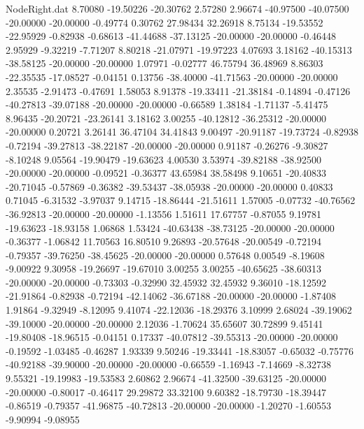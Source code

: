 \begin{filecontents}{NodeRight.dat}
   8.70080  -19.50226  -20.30762     2.57280    2.96674  -40.97500  -40.07500  -20.00000  -20.00000   -0.49774    0.30762   27.98434   32.26918
   8.75134  -19.53552  -22.95929    -0.82938   -0.68613  -41.44688  -37.13125  -20.00000  -20.00000   -0.46448    2.95929   -9.32219   -7.71207
   8.80218  -21.07971  -19.97223     4.07693    3.18162  -40.15313  -38.58125  -20.00000  -20.00000    1.07971   -0.02777   46.75794   36.48969
   8.86303  -22.35535  -17.08527    -0.04151    0.13756  -38.40000  -41.71563  -20.00000  -20.00000    2.35535   -2.91473   -0.47691    1.58053
   8.91378  -19.33411  -21.38184    -0.14894   -0.47126  -40.27813  -39.07188  -20.00000  -20.00000   -0.66589    1.38184   -1.71137   -5.41475
   8.96435  -20.20721  -23.26141     3.18162    3.00255  -40.12812  -36.25312  -20.00000  -20.00000    0.20721    3.26141   36.47104   34.41843
   9.00497  -20.91187  -19.73724    -0.82938   -0.72194  -39.27813  -38.22187  -20.00000  -20.00000    0.91187   -0.26276   -9.30827   -8.10248
   9.05564  -19.90479  -19.63623     4.00530    3.53974  -39.82188  -38.92500  -20.00000  -20.00000   -0.09521   -0.36377   43.65984   38.58498
   9.10651  -20.40833  -20.71045    -0.57869   -0.36382  -39.53437  -38.05938  -20.00000  -20.00000    0.40833    0.71045   -6.31532   -3.97037
   9.14715  -18.86444  -21.51611     1.57005   -0.07732  -40.76562  -36.92813  -20.00000  -20.00000   -1.13556    1.51611   17.67757   -0.87055
   9.19781  -19.63623  -18.93158     1.06868    1.53424  -40.63438  -38.73125  -20.00000  -20.00000   -0.36377   -1.06842   11.70563   16.80510
   9.26893  -20.57648  -20.00549    -0.72194   -0.79357  -39.76250  -38.45625  -20.00000  -20.00000    0.57648    0.00549   -8.19608   -9.00922
   9.30958  -19.26697  -19.67010     3.00255    3.00255  -40.65625  -38.60313  -20.00000  -20.00000   -0.73303   -0.32990   32.45932   32.45932
   9.36010  -18.12592  -21.91864    -0.82938   -0.72194  -42.14062  -36.67188  -20.00000  -20.00000   -1.87408    1.91864   -9.32949   -8.12095
   9.41074  -22.12036  -18.29376     3.10999    2.68024  -39.19062  -39.10000  -20.00000  -20.00000    2.12036   -1.70624   35.65607   30.72899
   9.45141  -19.80408  -18.96515    -0.04151    0.17337  -40.07812  -39.55313  -20.00000  -20.00000   -0.19592   -1.03485   -0.46287    1.93339
   9.50246  -19.33441  -18.83057    -0.65032   -0.75776  -40.92188  -39.90000  -20.00000  -20.00000   -0.66559   -1.16943   -7.14669   -8.32738
   9.55321  -19.19983  -19.53583     2.60862    2.96674  -41.32500  -39.63125  -20.00000  -20.00000   -0.80017   -0.46417   29.29872   33.32100
   9.60382  -18.79730  -18.39447    -0.86519   -0.79357  -41.96875  -40.72813  -20.00000  -20.00000   -1.20270   -1.60553   -9.90994   -9.08955

\end{filecontents}
